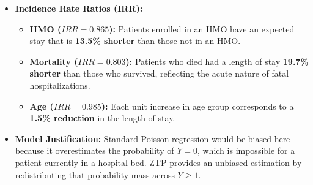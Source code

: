 \documentclass[12pt]{article}
\begin{document}
\begin{itemize}
    \item \textbf{Incidence Rate Ratios (IRR):} 
    \begin{itemize}
        \item \textbf{HMO ($IRR = 0.865$):} Patients enrolled in an HMO have an expected stay that is \textbf{13.5\% shorter} than those not in an HMO.
        \item \textbf{Mortality ($IRR = 0.803$):} Patients who died had a length of stay \textbf{19.7\% shorter} than those who survived, reflecting the acute nature of fatal hospitalizations.
        \item \textbf{Age ($IRR = 0.985$):} Each unit increase in age group corresponds to a \textbf{1.5\% reduction} in the length of stay.
    \end{itemize}
    \item \textbf{Model Justification:} Standard Poisson regression would be biased here because it overestimates the probability of $Y=0$, which is impossible for a patient currently in a hospital bed. ZTP provides an unbiased estimation by redistributing that probability mass across $Y \ge 1$.
\end{itemize}

\
\end{document}
